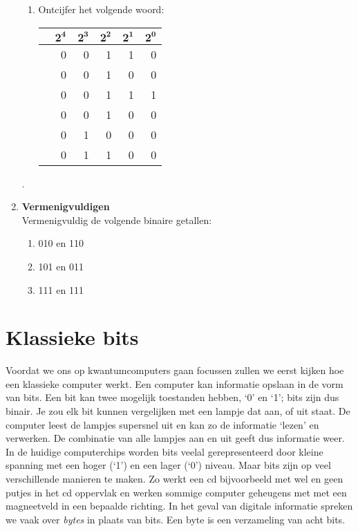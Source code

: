 \documentclass[10pt,a4paper,titlepage]{article}
\newcommand{\1}{\'{e}\'{e}n}
\begin{document}
\begin{enumerate}
\begin{enumerate}
\item{Ontcijfer het volgende woord:}
\begin{table}[h!]
\begin{tabular}{c|rrrrr}
    & $\mathbf{2^4}$&$\mathbf{2^3}$ & $\mathbf{2^2}$    & $\mathbf{2^1}$    & $\mathbf{2^0}$\\ \hline
   &0              & 0             & 1             & 1             & 0\\
   & 0             & 0             & 1             & 0             & 0\\
   & 0             & 0             & 1             & 1             & 1\\
   & 0             & 0             & 1             & 0             & 0 \\
    & 0             & 1             & 0             & 0             & 0\\
   & 0             & 1             & 1             & 0             & 0\\
\end{tabular}
\end{table}


\end{enumerate}
.
\item \textbf{Vermenigvuldigen}\\
Vermenigvuldig de volgende binaire getallen:

\begin{enumerate}
\item 010 en 110
\item 101 en 011
\item 111 en 111
\end{enumerate}
\end{enumerate}

\newpage

\section*{Klassieke bits}
Voordat we ons op kwantumcomputers gaan focussen zullen we eerst kijken hoe een klassieke computer werkt. Een computer kan informatie opslaan in de vorm van bits. Een bit kan twee mogelijk toestanden hebben, `0' en `1'; bits zijn dus binair. Je zou elk bit kunnen vergelijken met een lampje dat aan, of uit staat. De computer leest de lampjes supersnel uit en kan zo de informatie `lezen' en verwerken. De combinatie van alle lampjes aan en uit geeft dus informatie weer. In de huidige computerchips worden bits veelal gerepresenteerd door kleine spanning met een hoger (`1') en een lager (`0') niveau. Maar bits zijn op veel verschillende manieren te maken. Zo werkt een cd bijvoorbeeld met wel en geen putjes in het cd oppervlak en werken sommige computer geheugens met met een magneetveld in een bepaalde richting. In het geval van digitale informatie spreken we vaak over \emph{bytes} in plaats van bits. Een byte is een verzameling van acht bits.
\end{document}
